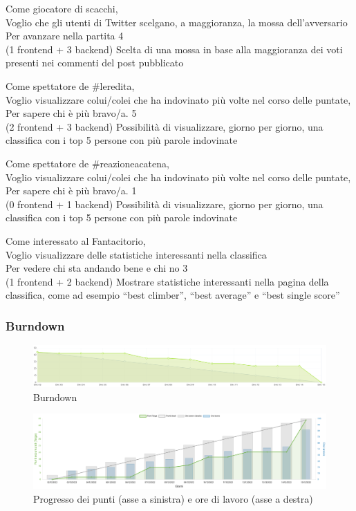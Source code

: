 \userstory%
{Come giocatore di scacchi,\\Voglio che gli utenti di Twitter scelgano, a maggioranza, la mossa dell'avversario\\Per avanzare nella partita}%
{4\\(1 frontend + 3 backend)}%
{Scelta di una mossa in base alla maggioranza dei voti presenti nei commenti del post pubblicato}%
{}

\userstory%
{Come spettatore de \#leredita,\\Voglio visualizzare colui/colei che ha indovinato più volte nel corso delle puntate,\\Per sapere chi è più bravo/a.}%
{5\\(2 frontend + 3 backend)}%
{Possibilità di visualizzare, giorno per giorno, una classifica con i top 5 persone con più parole indovinate}%
{}

\userstory%
{Come spettatore de \#reazioneacatena,\\Voglio visualizzare colui/colei che ha indovinato più volte nel corso delle puntate,\\Per sapere chi è più bravo/a.}%
{1\\(0 frontend + 1 backend)}%
{Possibilità di visualizzare, giorno per giorno, una classifica con i top 5 persone con più parole indovinate}%
{}

\userstory%
{Come interessato al Fantacitorio,\\Voglio visualizzare delle statistiche interessanti nella classifica\\Per vedere chi sta andando bene e chi no}%
{3\\(1 frontend + 2 backend)}%
{Mostrare statistiche interessanti nella pagina della classifica, come ad esempio “best climber”, “best average” e “best single score”}%
{}

\subsubsection{Burndown}
\begin{figure}[H]
    \centering
    \includegraphics[width=15cm]{./img/sprint4/burndown.png}
    \caption{Burndown}
\end{figure}
\begin{figure}[H]
    \centering
    \includegraphics[width=15cm]{./img/sprint4/worktime.png}
    \caption{Progresso dei punti (asse a sinistra) e ore di lavoro (asse a destra)}
\end{figure}

